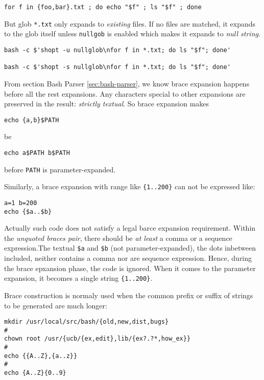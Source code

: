 \begin{lstlisting}
for f in {foo,bar}.txt ; do echo "$f" ; ls "$f" ; done
\end{lstlisting}

But glob \lstinline|*.txt| only expands to \textit{existing} files. If
no files are matched, it expands to the glob itself unless
\lstinline|nullgob| is enabled which makes it expands to
\textit{null string}.

\begin{lstlisting}
bash -c $'shopt -u nullglob\nfor f in *.txt; do ls "$f"; done'

bash -c $'shopt -s nullglob\nfor f in *.txt; do ls "$f"; done'
\end{lstlisting}

From section Bash Parser \ref{sec:bash-parser}, we know brace
expansion happens before all the rest expansions. Any characters
special to other expansions are preserved in the result:
\textit{strictly textual}. So brace expansion makes

\lstinline|echo {a,b}$PATH|

be

\lstinline|echo a$PATH b$PATH|

before \verb|PATH| is parameter-expanded.

Similarly, a brace expansion with range like \lstinline|{1..200}|
can not be expressed like:

\begin{lstlisting}
a=1 b=200
echo {$a..$b}
\end{lstlisting}

Actually such code does not satisfy a legal barce expansion
requirement. Within the \textit{unquoted braces pair}, there
should be \textit{at least} a comma or a sequence expression.The
textual \verb|$a| and \verb|$b| (not parameter-expanded), the dots
inbetween included, neither contains a comma nor are sequence
expression. Hence, during the brace epxansion phase, the code is
ignored. When it comes to the parameter expansion, it becomes a
single string \lstinline|{1..200}|.

Brace construction is normaly used when the common prefix or
suffix of strings to be generated are much longer:

\begin{lstlisting}
mkdir /usr/local/src/bash/{old,new,dist,bugs}
#
chown root /usr/{ucb/{ex,edit},lib/{ex?.?*,how_ex}}
#
echo {{A..Z},{a..z}}
#
echo {A..Z}{0..9}
\end{lstlisting}


